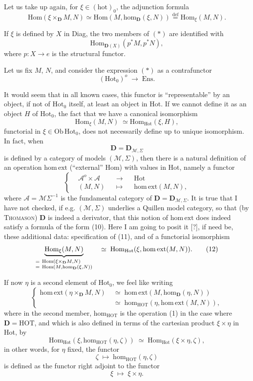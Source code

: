 \documentclass[11pt]{article}
\newcommand{\printedpage}[1]{\marginpar{\footnotesize p.~#1}}
\newcommand{\msp}[1]{\marginpar{\footnotesize [#1]}}
\newcommand{\D}{\mathbf{D}}
\newcommand{\Hot}{\mathrm{Hot}}
\newcommand{\Hom}{\mathrm{Hom}}
\newcommand{\hm}{\mathrm{hom}}
\newcommand{\homext}{\mathrm{hom}\,\mathrm{ext}}
\newcommand{\HOT}{\mathrm{HOT}}
\newcommand{\Ob}{\mathrm{Ob}\,}
\newcommand{\defeq}{\overset{\text{def}}{=}}
\begin{document}
Let us take up again, for $\xi\in(\mathrm{hot})_0$, the adjunction formula
\[
\Hom(\xi\times_{\D}M,N)\simeq\Hom(M,\hm_{\D}(\xi,N))\defeq\Hom_{\xi}(M,N).
\tag*{$(*)$}
\]

If $\xi$ is defined by $X$ in Diag, the two members of $(*)$ are identified with
\[
\Hom_{\D(X)}(p^*M,p^*N),
\]
where $p:X\longrightarrow e$ is the structural functor.

Let us fix $M$, $N$, and consider the expression $(*)$ as a contrafunctor
\[
(\Hot_0)^o\;\longrightarrow\;\mathrm{Ens}.
\]

It would seem that in all known cases, this functor is ``representable'' by an object, if not of $\Hot_0$ itself, at least an object in Hot. If we cannot define it as an object $H$ of $\Hot_0$, the fact that we have a canonical isomorphism
\[
\Hom_{\xi}(M,N)\;\simeq\Hom_{\Hot}(\xi,H),
\tag*{(10)}
\]
functorial in $\xi\in\Ob\Hot_0$, does not necessarily define
\msp{page 8}
up to unique isomorphism. In fact, when
\[
\D=\D_{\mathcal{M},\Sigma}
\]
is defined by a category of models $(\mathcal{M},\Sigma)$, then there is a natural definition of an operation $\homext$ (``external'' Hom) with values in Hot, namely a functor
\[
\left\{
\begin{aligned}
&\mathcal{A}^o\times\mathcal{A} &&\longrightarrow &&\mathrm{Hot}\\
&(M,N) &&\longmapsto &&\homext(M,N),
\end{aligned}
\right.
\tag*{(11)}
\]
where $\mathcal{A}=\mathcal{M}\Sigma^{-1}$ is the fundamental category of $\D=\D_{\mathcal{M},\Sigma}$. It is true that I have not checked, if e.g. $(\mathcal{M},\Sigma)$ underlies a Quillen model category, so that (by \textsc{Thomason}) $\D$ is indeed a derivator, that this notion of $\homext$ does indeed satisfy a formula of the form (10). Here I am going to posit it [?], if need be, these additional data: specification of (11), and of a functorial isomorphism
\[
\underbrace{\Hom_{\xi}(M,N)}_{\begin{subarray}{l}=\ \Hom(\xi\times_{\D}M,N)\\ =\ \Hom(M,\hm_{\D}(\xi,N))\end{subarray}}
\quad\simeq\;\Hom_{\Hot}(\xi,\homext(M,N)).
\tag*{(12)}
\]

\printedpage{6}
\msp{page 9}
If now $\eta$ is a second element of $\Hot_0$, we feel like writing
\[
\left\{
\begin{aligned}
\homext(\eta\times_{\D}M,N) &\;\simeq\;\homext(M,\hm_{\D}(\eta,N))\\
&\;\simeq\;\hm_{\HOT}(\eta,\homext(M,N)),
\end{aligned}
\right.
\tag*{(13)}
\]
where in the second member, $\hm_{\HOT}$ is the operation (1) in the case where $\D=\mathrm{HOT}$, and which is also defined in terms of the cartesian product $\xi\times\eta$ in Hot, by
\[
\Hom_{\Hot}(\xi,\hm_{\HOT}(\eta,\zeta))\;\simeq\;\Hom_{\Hot}(\xi\times\eta,\zeta),
\]
in other words, for $\eta$ fixed, the functor
\[
\zeta\;\longmapsto\;\hm_{\HOT}(\eta,\zeta)
\]
is defined as the functor right adjoint to the functor
\[
\xi\;\longmapsto\;\xi\times\eta.
\]
\end{document}
